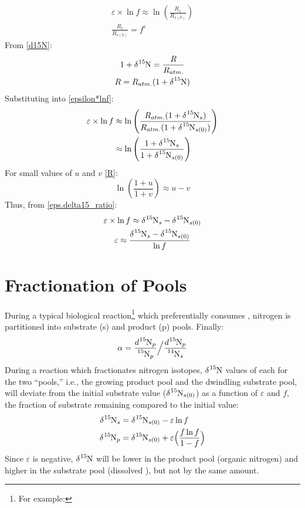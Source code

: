 \begin{gather}
    \varepsilon \times \ln{f} \approx \ln{\left(\frac{R_s}{R_{s(0)}}\right)}\label{epsilon*lnf}\\
    \frac{R_s}{R_{s(0)}}=f^\varepsilon
\end{gather}
From \eqref{d15N}:
\begin{gather}
1+\delta\ce{^{15}N}=\frac{R}{R_{atm.}}\nonumber\\
R=R_{atm.}(1+\delta\ce{^{15}N})
\end{gather}
Substituting into \eqref{epsilon*lnf}:
\begin{align}
    \varepsilon \times \ln{f} &\approx \ln{\left(\frac{R_{atm.}(1+\delta\ce{^{15}N}_s)}{R_{atm.}(1+\delta\ce{^{15}N}_{s(0)})}\right)}\nonumber\\
    &\approx \ln{\left(\frac{1+\delta\ce{^{15}N}_s}{1+\delta\ce{^{15}N}_{s(0)}}\right)}\label{eps.delta15_ratio}
\end{align}
For small values of $u$ and $v$ \eqref{R}:
\[\ln{\left(\frac{1+u}{1+v}\right)}\approx u-v\]
Thus, from \eqref{eps.delta15_ratio}:
\begin{gather}
    \varepsilon \times \ln{f} \approx \delta\ce{^{15}N}_s - \delta\ce{^{15}N}_{s(0)}\nonumber\\
    \varepsilon \approx \frac{\delta\ce{^{15}N}_s - \delta\ce{^{15}N}_{s(0)}}{\ln{f}}
\end{gather}

\section{Fractionation of Pools}
During a typical biological reaction\footnote{For example: } which preferentially consumes , nitrogen is partitioned into substrate (s) and product (p) pools. 
Finally:
\begin{equation}
    \alpha = \dfrac{d\ce{^{15}N_p}}{\ce{^{15}N_p}}\Big/\dfrac{d\ce{^{15}N_p}}{\ce{^{14}N_s}}
\end{equation}
During a reaction which fractionates nitrogen isotopes,  $\delta\ce{^{15}N}$ values of each for the two ``pools,'' i.e., the growing product pool and the dwindling substrate pool, will deviate from the initial substrate value ($\delta\ce{^{15}N_{s(0)}}$) as a function of $\varepsilon$ and $f$, the fraction of substrate remaining compared to the initial value:
\begin{align}
    \delta\ce{^{15}N_s}&=\delta\ce{^{15}N_{s(0)}}-\varepsilon\ln{f}\label{d15ns}\\
    \delta\ce{^{15}N_p}&=\delta\ce{^{15}N_{s(0)}}+\varepsilon\Big(\frac{f\ln{f}}{1-f}\Big)\label{d15np}
\end{align}
Since $\varepsilon$ is negative, $\delta\ce{^{15}N}$ will be lower in the product pool (organic nitrogen) and higher in the substrate pool (dissolved ), but not by the same amount.

